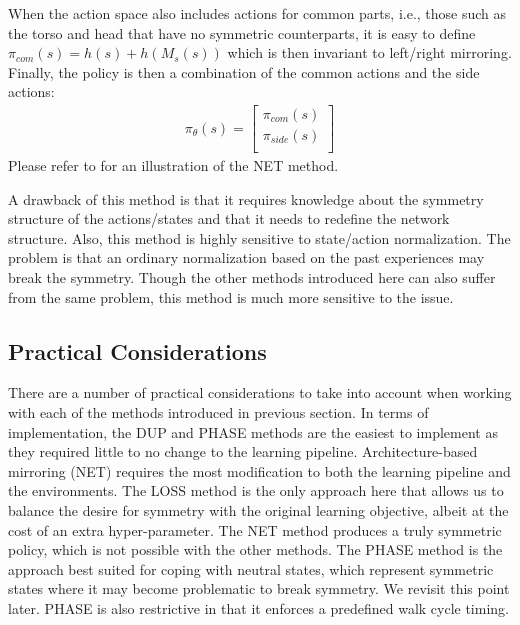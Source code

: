 When the action space also includes actions for common parts,
i.e., those such as the torso and head that have no symmetric counterparts,
it is easy to define $\pi_{com}(s) = h(s) + h(M_s(s))$ 
which is then invariant to left/right mirroring. 
Finally, the policy is then a combination of the common actions and the side actions:
\begin{align*}
    \pi_\theta(s) = \begin{bmatrix}
        \pi_{com}(s)\\
        \pi_{side}(s)\\
    \end{bmatrix}
\end{align*}
Please refer to  for an illustration of the NET method.

A drawback of this method is that it requires knowledge about the symmetry structure of the actions/states 
and that it needs to redefine the network structure. 
Also, this method is highly sensitive to state/action normalization.
The problem is that an ordinary normalization based on the past experiences may break the symmetry.
Though the other methods introduced here can also suffer from the same problem, this method is much more sensitive to the issue.

\subsection{Practical Considerations}

There are a number of practical considerations to take into account when working with 
each of the methods introduced in previous section.
In terms of implementation, the DUP and PHASE methods are the easiest to 
implement as they required little to no change to the learning pipeline.  
Architecture-based mirroring (NET)
requires the most modification to both the learning pipeline and the environments.
The LOSS method is the only approach here that allows us to balance the desire for symmetry 
with the original learning objective, albeit at the cost of an extra hyper-parameter.  
The NET method produces a truly symmetric policy, which is not possible with the other methods.
The PHASE method is the approach best suited for coping with neutral states, 
which represent symmetric states where it may become problematic to break symmetry.
We revisit this point later.
PHASE is also restrictive in that it enforces a predefined walk cycle timing.


